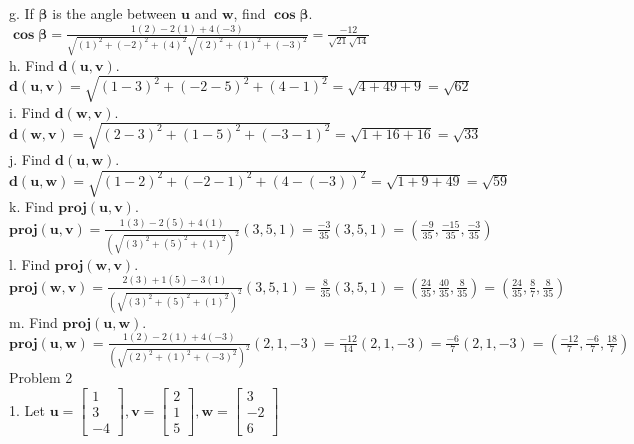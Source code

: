 \documentclass[11pt]{article}
\begin{document}
g. If $\mathbf{\beta}$ is the angle between $\mathbf{u}$ and $\mathbf{w}$, find $\mathbf{\cos \beta}$. \\[5pt]

$
\mathbf{\cos \beta}
= \frac{1(2)-2(1)+4(-3)}{\sqrt{(1)^2+(-2)^2+(4)^2}\sqrt{(2)^2+(1)^2+(-3)^2}}
= \frac{-12}{\sqrt{21} \sqrt{14}}
$ \\[5pt]

h. Find $\mathbf{d(u,v)}$. \\[5pt]

$
\mathbf{d(u,v)}
= \sqrt{(1-3)^2 + (-2-5)^2 + (4-1)^2}
= \sqrt{4 + 49 + 9}
= \sqrt{62}
$ \\[5pt]

i. Find $\mathbf{d(w,v)}$. \\[5pt]

$
\mathbf{d(w,v)}
= \sqrt{(2-3)^2 + (1-5)^2 + (-3-1)^2}
= \sqrt{1 + 16 + 16}
= \sqrt{33}
$ \\[5pt]

j. Find $\mathbf{d(u,w)}$. \\[5pt]

$
\mathbf{d(u,w)}
= \sqrt{(1-2)^2 + (-2-1)^2 + (4-(-3))^2}
= \sqrt{1 + 9 + 49}
= \sqrt{59}
$ \\[5pt]

k. Find $\mathbf{proj(u,v)}$. \\[5pt]

$
\mathbf{proj(u,v)}
= \frac{1(3)-2(5)+4(1)}{\left(\sqrt{(3)^2+(5)^2+(1)^2}\right)^2}(3,5,1)
= \frac{-3}{35}(3,5,1)
= (\frac{-9}{35},\frac{-15}{35},\frac{-3}{35})
$ \\[5pt]

l. Find $\mathbf{proj(w,v)}$. \\[5pt]

$
\mathbf{proj(w,v)}
= \frac{2(3)+1(5)-3(1)}{\left(\sqrt{(3)^2+(5)^2+(1)^2}\right)^2}(3,5,1)
= \frac{8}{35}(3,5,1)
= (\frac{24}{35},\frac{40}{35},\frac{8}{35})
= (\frac{24}{35},\frac{8}{7},\frac{8}{35})
$ \\[5pt]

m. Find $\mathbf{proj(u,w)}$. \\[5pt]

$
\mathbf{proj(u,w)}
= \frac{1(2)-2(1)+4(-3)}{\left(\sqrt{(2)^2+(1)^2+(-3)^2}\right)^2}(2,1,-3)
= \frac{-12}{14}(2,1,-3)
= \frac{-6}{7}(2,1,-3)
= (\frac{-12}{7},\frac{-6}{7},\frac{18}{7})
$ \\[5pt]

Problem 2 \\[5pt]

1. Let 
$\textbf{u} =
\begin{bmatrix}
 1 \\ 3 \\ -4
\end{bmatrix},
\textbf{v}=
\begin{bmatrix}
 2 \\ 1 \\ 5
\end{bmatrix},
\textbf{w}=
\begin{bmatrix}
3 \\ -2 \\ 6
\end{bmatrix}$ \\[5pt]
\end{document}
